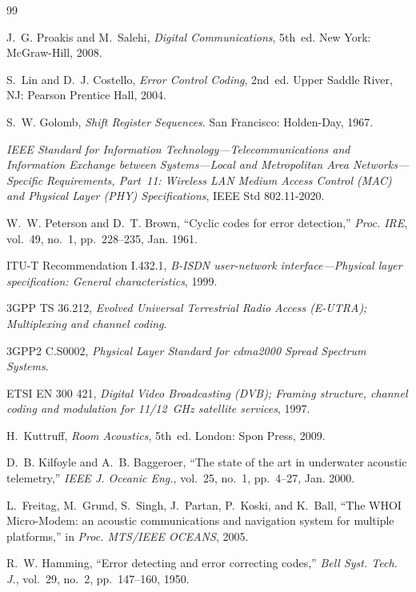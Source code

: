 \documentclass[11pt,a4paper]{article}
\theoremstyle{remark}
\begin{document}
\clearpage
\begin{thebibliography}{99}
\small

J.~G. Proakis and M.~Salehi, \emph{Digital Communications}, 5th~ed. New York: McGraw-Hill, 2008.

S.~Lin and D.~J. Costello, \emph{Error Control Coding}, 2nd~ed. Upper Saddle River, NJ: Pearson Prentice Hall, 2004.

S.~W. Golomb, \emph{Shift Register Sequences}. San Francisco: Holden-Day, 1967.

\emph{IEEE Standard for Information Technology---Telecommunications and Information Exchange between Systems---Local and Metropolitan Area Networks---Specific Requirements, Part~11: Wireless LAN Medium Access Control (MAC) and Physical Layer (PHY) Specifications}, IEEE Std 802.11-2020.

W.~W. Peterson and D.~T. Brown, ``Cyclic codes for error detection,'' \emph{Proc. IRE}, vol.~49, no.~1, pp.~228--235, Jan. 1961.

ITU-T Recommendation I.432.1, \emph{B-ISDN user-network interface---Physical layer specification: General characteristics}, 1999.

3GPP TS 36.212, \emph{Evolved Universal Terrestrial Radio Access (E-UTRA); Multiplexing and channel coding}.

3GPP2 C.S0002, \emph{Physical Layer Standard for cdma2000 Spread Spectrum Systems}.

ETSI EN 300 421, \emph{Digital Video Broadcasting (DVB); Framing structure, channel coding and modulation for 11/12~GHz satellite services}, 1997.

H.~Kuttruff, \emph{Room Acoustics}, 5th~ed. London: Spon Press, 2009.

D.~B. Kilfoyle and A.~B. Baggeroer, ``The state of the art in underwater acoustic telemetry,'' \emph{IEEE J. Oceanic Eng.}, vol.~25, no.~1, pp.~4--27, Jan. 2000.

L.~Freitag, M.~Grund, S.~Singh, J.~Partan, P.~Koski, and K.~Ball, ``The WHOI Micro-Modem: an acoustic communications and navigation system for multiple platforms,'' in \emph{Proc. MTS/IEEE OCEANS}, 2005.

R.~W. Hamming, ``Error detecting and error correcting codes,'' \emph{Bell Syst. Tech. J.}, vol.~29, no.~2, pp.~147--160, 1950.


\end{thebibliography}
\end{document}
